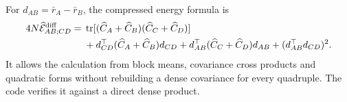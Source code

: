 For $d_{AB}=\bar r_A-\bar r_B$, the compressed energy formula is
\begin{align*}
 4N\widehat{\mathcal E}_{AB;CD}^{\rm diff}
 ={}&\operatorname{tr}[(\widehat C_A+\widehat C_B)
                       (\widehat C_C+\widehat C_D)]\\
 &+d_{CD}^\top(\widehat C_A+\widehat C_B)d_{CD}
  +d_{AB}^\top(\widehat C_C+\widehat C_D)d_{AB}
  +(d_{AB}^\top d_{CD})^2.
\end{align*}
It allows the calculation from block means, covariance cross products and
quadratic forms without rebuilding a dense covariance for every quadruple.
The code verifies it against a direct dense product.
